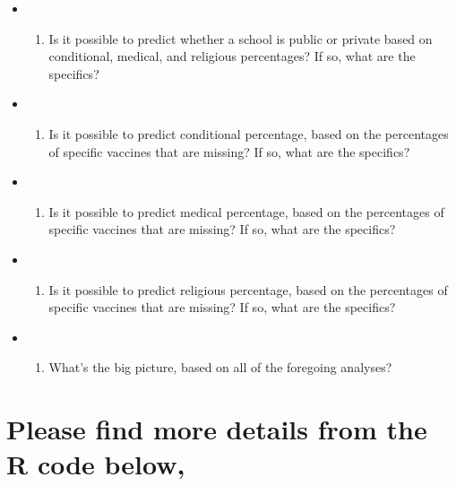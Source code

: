 \documentclass[]{article}
\providecommand{\tightlist}{%
  \setlength{\itemsep}{0pt}\setlength{\parskip}{0pt}}
\begin{document}
\begin{itemize}
\item
  \begin{enumerate}
  \def\labelenumi{\arabic{enumi}.}
  \setcounter{enumi}{8}
  \tightlist
  \item
    Is it possible to predict whether a school is public or private
    based on conditional, medical, and religious percentages? If so,
    what are the specifics?
  \end{enumerate}
\item
  \begin{enumerate}
  \def\labelenumi{\arabic{enumi}.}
  \setcounter{enumi}{9}
  \tightlist
  \item
    Is it possible to predict conditional percentage, based on the
    percentages of specific vaccines that are missing? If so, what are
    the specifics?
  \end{enumerate}
\item
  \begin{enumerate}
  \def\labelenumi{\arabic{enumi}.}
  \setcounter{enumi}{10}
  \tightlist
  \item
    Is it possible to predict medical percentage, based on the
    percentages of specific vaccines that are missing? If so, what are
    the specifics?
  \end{enumerate}
\item
  \begin{enumerate}
  \def\labelenumi{\arabic{enumi}.}
  \setcounter{enumi}{11}
  \tightlist
  \item
    Is it possible to predict religious percentage, based on the
    percentages of specific vaccines that are missing? If so, what are
    the specifics?
  \end{enumerate}
\item
  \begin{enumerate}
  \def\labelenumi{\arabic{enumi}.}
  \setcounter{enumi}{12}
  \tightlist
  \item
    What's the big picture, based on all of the foregoing analyses?
  \end{enumerate}
\end{itemize}

\hypertarget{please-find-more-details-from-the-r-code-below}{%
\section{Please find more details from the R code
below,}\label{please-find-more-details-from-the-r-code-below}}
\end{document}
